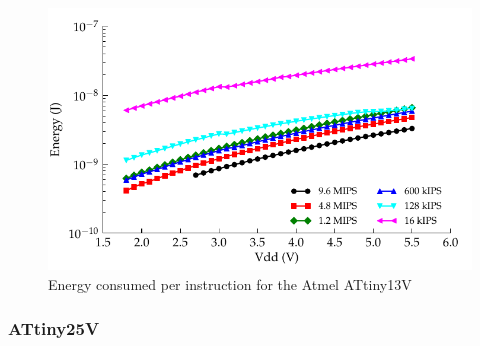 \begin{figure}
\begin{centering}
\includegraphics{content/appendices/microprocessorPowerMeasurements/graphics/Graph_ATtiny13V_Clock_JPI}
\par\end{centering}

\protect\caption{
\label{fig:ATtiny13VClkJPI}Energy consumed per instruction for the
Atmel ATtiny13V
}


\end{figure}



\subsubsection{ATtiny25V}


